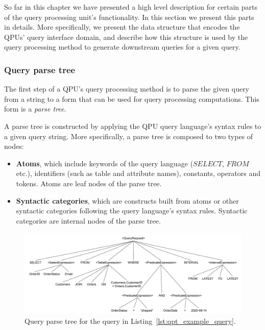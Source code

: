 So far in this chapter we have presented a high level description for certain parts of the query processing unit's
functionality.
In this section we present this parts in details.
More specifically, we present the data structure that encodes the QPUs' query interface domain,
and describe how this structure is used by the query processing method to generate downstream queries for a given query.

\subsubsection{Query parse tree}
\label{sec:query_parse_tree}

The first step of a QPU's query processing method is to parse the given query from a string to a form that can be used
for query processing computations.
This form is a \textit{parse tree}.

A parse tree is constructed by applying the QPU query language's syntax rules to a given query string.
More specifically, a parse tree is composed to two types of nodes:

\begin{itemize}
  \item \textbf{Atoms}, which include keywords of the query language ($SELECT$, $FROM$ etc.),
  identifiers (such as table and attribute names), constants, operators and tokens.
  Atoms are leaf nodes of the parse tree.

  \item \textbf{Syntactic categories}, which are constructs built from atoms or other syntactic categories
  following the query language's syntax rules.
  Syntactic categories are internal nodes of the parse tree.
\end{itemize}

\begin{figure}[H]
  \centering
    \includegraphics[width=\textwidth]{./figures/design_pattern/parse_tree.pdf}
  \caption{Query parse tree for the query in Listing~\ref{lst:qpt_example_query}.}
  \label{fig:parse_tree}
\end{figure}

